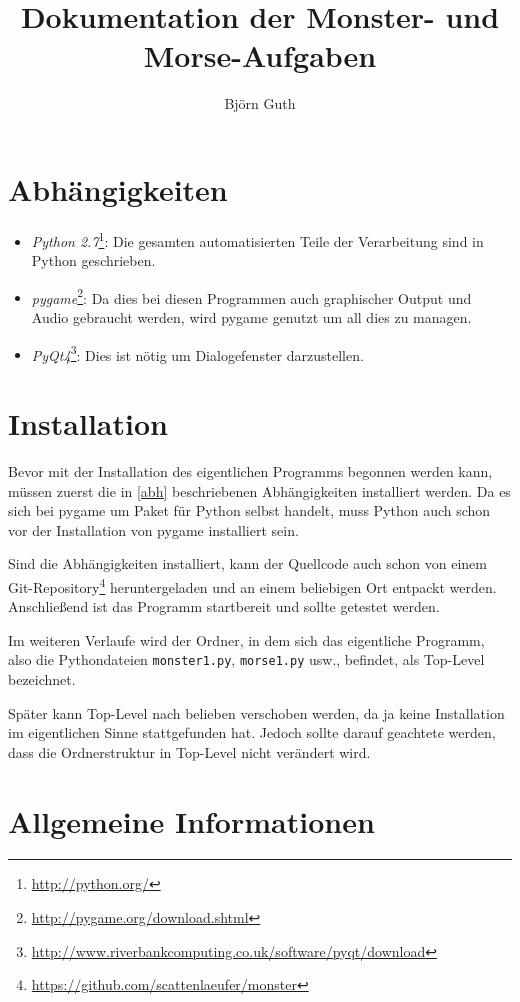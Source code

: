 \documentclass[a4paper]{scrartcl}
\author{Bj\"orn Guth}
\title{Dokumentation der Monster- und Morse-Aufgaben}
\newtheorem[M]{thmL}{Definition}
\begin{document}
\maketitle

\section{Abhängigkeiten}
\label{abh}
\begin{itemize}
	\item \emph{Python 2.7}\footnote{\url{http://python.org/}}: Die gesamten automatisierten Teile der Verarbeitung sind in Python geschrieben.
	\item \emph{pygame}\footnote{\url{http://pygame.org/download.shtml}}: Da dies bei diesen Programmen auch graphischer Output und Audio gebraucht werden, wird pygame genutzt um all dies zu managen.
	\item \emph{PyQt4}\footnote{\url{http://www.riverbankcomputing.co.uk/software/pyqt/download}}: Dies ist nötig um Dialogefenster darzustellen.
\end{itemize}

\section{Installation}
Bevor mit der Installation des eigentlichen Programms begonnen werden kann, müssen zuerst die in \autoref{abh} beschriebenen Abhängigkeiten installiert werden. Da es sich bei pygame um Paket für Python selbst handelt, muss Python auch schon vor der Installation von pygame installiert sein.

Sind die Abhängigkeiten installiert, kann der Quellcode auch schon von einem Git-Repository\footnote{\url{https://github.com/scattenlaeufer/monster}} heruntergeladen und an einem beliebigen Ort entpackt werden. Anschließend ist das Programm startbereit und sollte getestet werden.
\begin{thmL}
	Im weiteren Verlaufe wird der Ordner, in dem sich das eigentliche Programm, also die Pythondateien \verb+monster1.py+, \verb+morse1.py+ usw., befindet, als Top-Level bezeichnet.
\end{thmL}
Später kann Top-Level nach belieben verschoben werden, da ja keine Installation im eigentlichen Sinne stattgefunden hat. Jedoch sollte darauf geachtete werden, dass die Ordnerstruktur in Top-Level nicht verändert wird.

\section{Allgemeine Informationen}
\end{document}
